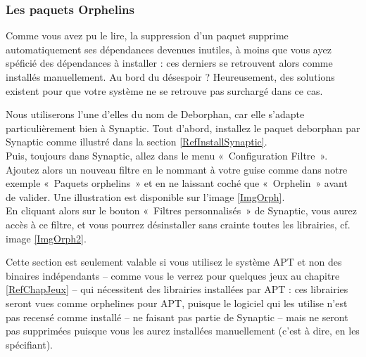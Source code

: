 {\subsubsection{Les paquets Orphelins}
Comme vous avez pu le lire, la suppression d'un paquet supprime automatiquement ses dépendances devenues inutiles, à moins que vous ayez spéficié des dépendances à installer : ces derniers se retrouvent alors comme installés manuellement. Au bord du désespoir ? Heureusement, des solutions existent pour que votre système ne se retrouve pas surchargé dans ce cas.\par
Nous utiliserons l'une d'elles du nom de Deborphan, car elle s'adapte particulièrement bien à Synaptic. Tout d'abord, installez le paquet deborphan par Synaptic comme illustré dans la section \ref{RefInstallSynaptic}.\\
Puis, toujours dans Synaptic, allez dans le menu «~Configuration \FlecheDroite Filtre~». Ajoutez alors un nouveau filtre en le nommant à votre guise comme dans notre exemple «~Paquets orphelins~» et en ne laissant coché que «~Orphelin~» avant de valider. Une illustration est disponible sur l'image \ref{ImgOrph}.\\
En cliquant alors sur le bouton «~Filtres personnalisés~» de Synaptic, vous aurez accès à ce filtre, et vous pourrez désinstaller sans crainte toutes les librairies, cf. image \ref{ImgOrph2}.\\
\begin{nota}
Cette section est seulement valable si vous utilisez le système APT et non des binaires indépendants -- comme vous le verrez pour quelques jeux au chapitre \ref{RefChapJeux} -- qui nécessitent des librairies installées par APT : ces librairies seront vues comme orphelines pour APT, puisque le logiciel qui les utilise n'est pas recensé comme installé -- ne faisant pas partie de Synaptic -- mais ne seront pas supprimées puisque vous les aurez installées manuellement (c'est à dire, en les spécifiant).
\end{nota}
}
